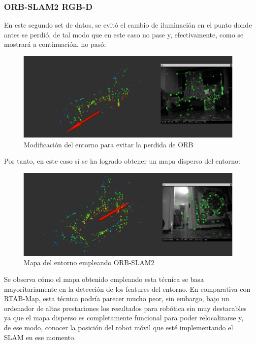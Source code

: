 \newpage
\subsubsection{ORB-SLAM2 RGB-D}
En este segundo set de datos, se evitó el cambio de iluminación en el punto donde antes se perdió, de tal modo que en este caso no pase y, efectivamente, como se mostrará a continuación, no pasó:
\begin{figure}[h!]
    \centering
    \includegraphics[width=.9\textwidth]{images/slam/bag3_orb_avoidLOSE}
    \caption{Modificación del entorno para evitar la perdida de ORB}
\end{figure}

Por tanto, en este caso sí se ha logrado obtener un mapa disperso del entorno:
\begin{figure}[h!]
    \centering
    \includegraphics[width=.9\textwidth]{images/slam/bag3_orb_map}
    \caption{Mapa del entorno empleando ORB-SLAM2}
\end{figure}

Se observa cómo el mapa obtenido empleando esta técnica se basa mayoritariamente en la detección de los features del entorno. En comparativa con RTAB-Map, esta técnica podría parecer
mucho peor, sin embargo, bajo un ordenador de altas prestaciones los resultados para robótica sin muy destacables ya que el mapa disperso es completamente funcional para poder relocalizarse
y, de ese modo, conocer la posición del robot móvil que esté implementando el SLAM en ese momento.
\newpage
